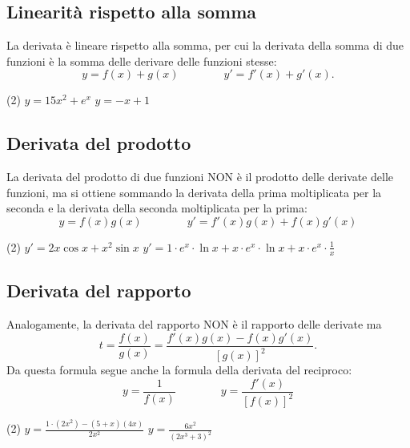 \documentclass{book}     %
\begin{document}
    \subsection{Linearità rispetto alla somma}
    La derivata è lineare rispetto alla somma, per cui la derivata della somma di due funzioni è la somma delle derivare delle funzioni stesse:
    \[y=f(x)+g(x)\qquad \qquad y'=f'(x)+g'(x).\]
    \begin{ex}[
        Calcolare la derivata delle seguenti funzioni
        \begin{tasks}(2)
            \task $y=5x^3+e^x$
            \task $y=-\frac{1}{2}x^2+x+1$
        \end{tasks}
    ]
    \begin{tasks}(2)
        \task $y=15x^2+e^x$
        \task $y=-x+1$
    \end{tasks}
    \end{ex}

    \subsection{Derivata del prodotto}
    La derivata del prodotto di due funzioni NON è il prodotto  delle derivate delle funzioni, ma si ottiene sommando la derivata della prima moltiplicata per la seconda e la derivata della seconda moltiplicata per la prima:
    \[y=f(x)g(x)\qquad\qquad y'=f'(x)g(x)+f(x)g'(x)\]
    \begin{ex}[
        Calcolare la derivata delle seguenti funzioni
        \begin{tasks}(2)
            \task $y=x^2\cdot \cos x$
            \task $y=x\cdot e^x\cdot \ln x$
        \end{tasks}
    ]
    \begin{tasks}(2)
        \task $y'=2x\cos x+ x^2\sin x$
        \task $y'=1\cdot e^x \cdot \ln x+ x\cdot e^x\cdot \ln x+ x\cdot e^x \cdot \frac{1}{x}$
    \end{tasks}
    \end{ex}

    \subsection{Derivata del rapporto}
    Analogamente, la derivata del rapporto NON è il rapporto delle derivate ma 
    \[t=\frac{f(x)}{g(x)}=\frac{f'(x)g(x)-f(x)g'(x)}{[g(x)]^2}.\]
    Da questa formula segue anche la formula della derivata del reciproco:
    \[y=\frac{1}{f(x)}\qquad \qquad y=\frac{f'(x)}{[f(x)]^2}\]
    \begin{ex}[
        Calcolare la derivata delle seguenti funzioni
        \begin{tasks}(2)
            \task $y=\frac{5+x}{2x^2}$
            \task $y=\frac{1}{2x^3+3}$
        \end{tasks}
    ]
    \begin{tasks}(2)
        \task $y=\frac{1\cdot (2x^2)-(5+x)(4x)}{2x^2}$
        \task $y=\frac{6x^2}{(2x^3+3)^2}$
    \end{tasks}
\end{ex}
\end{document}
